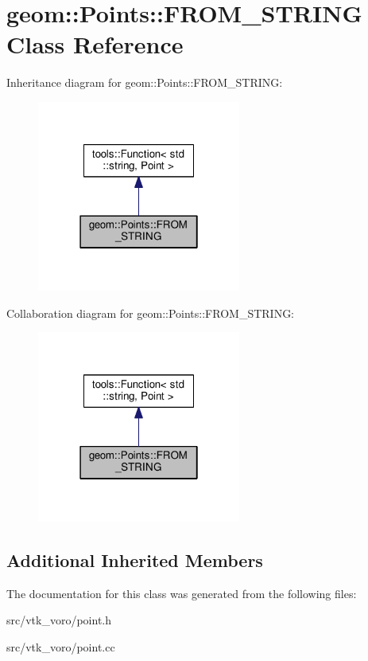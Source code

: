 \hypertarget{classgeom_1_1Points_1_1FROM__STRING}{}\section{geom\+:\+:Points\+:\+:F\+R\+O\+M\+\_\+\+S\+T\+R\+I\+NG Class Reference}
\label{classgeom_1_1Points_1_1FROM__STRING}


Inheritance diagram for geom\+:\+:Points\+:\+:F\+R\+O\+M\+\_\+\+S\+T\+R\+I\+NG\+:
\nopagebreak
\begin{figure}[H]
\begin{center}
\leavevmode
\includegraphics[width=190pt]{classgeom_1_1Points_1_1FROM__STRING__inherit__graph}
\end{center}
\end{figure}


Collaboration diagram for geom\+:\+:Points\+:\+:F\+R\+O\+M\+\_\+\+S\+T\+R\+I\+NG\+:
\nopagebreak
\begin{figure}[H]
\begin{center}
\leavevmode
\includegraphics[width=190pt]{classgeom_1_1Points_1_1FROM__STRING__coll__graph}
\end{center}
\end{figure}
\subsection*{Additional Inherited Members}


The documentation for this class was generated from the following files\+:\begin{DoxyCompactItemize}
\item 
src/vtk\+\_\+voro/point.\+h\item 
src/vtk\+\_\+voro/point.\+cc\end{DoxyCompactItemize}
